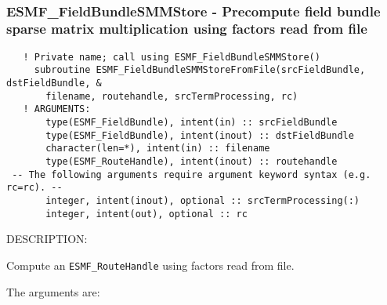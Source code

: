  
\mbox{}\hrulefill\ 
 
\subsubsection [ESMF\_FieldBundleSMMStore] {ESMF\_FieldBundleSMMStore - Precompute field bundle sparse matrix multiplication using factors read from file}


  
\begin{verbatim}   ! Private name; call using ESMF_FieldBundleSMMStore()
     subroutine ESMF_FieldBundleSMMStoreFromFile(srcFieldBundle, dstFieldBundle, &
       filename, routehandle, srcTermProcessing, rc)
   ! ARGUMENTS:
       type(ESMF_FieldBundle), intent(in) :: srcFieldBundle
       type(ESMF_FieldBundle), intent(inout) :: dstFieldBundle
       character(len=*), intent(in) :: filename
       type(ESMF_RouteHandle), intent(inout) :: routehandle
 -- The following arguments require argument keyword syntax (e.g. rc=rc). --
       integer, intent(inout), optional :: srcTermProcessing(:)
       integer, intent(out), optional :: rc\end{verbatim}
{\sf DESCRIPTION:\\ }


  
   Compute an {\tt ESMF\_RouteHandle} using factors read from file.
  
   The arguments are:
  
